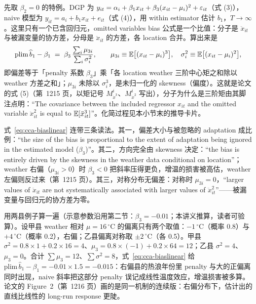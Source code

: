 先取 $\beta_2=0$ 的特例。DGP 为 $y_{it} = \alpha_i + \beta_1 x_{it} + \beta_3 (x_{it}-\mu_i)^2 + \varepsilon_{it}$（式 (3)），naive 模型为 $y_{it} = a_i + b_1 x_{it} + e_{it}$（式 (4)），用 within estimator 估计 $b_1$，$T\to\infty$。这里只有一个已含回归元，omitted variables bias 公式是一个比值：分子是 $\ddot{x}_{it}$ 与被漏变量的协方差，分母是 $\ddot{x}_{it}$ 的方差，各 location 合并。算出来是
\begin{equation}
\mathrm{plim}\,\widehat{b}_1 - \beta_1 \;=\; \beta_3\,\frac{\sum_i \mu_{3i}}{\sum_i \sigma_i^2},
\qquad
\mu_{3i} \equiv \mathbb{E}\bigl[(x_{it}-\mu_i)^3\bigr],\quad
\sigma_i^2 \equiv \mathbb{E}\bigl[(x_{it}-\mu_i)^2\bigr],
\label{eq:cca-biaslinear}
\end{equation}
即偏差等于「penalty 系数 $\beta_3$」乘「各 location weather 三阶中心矩之和除以 weather 方差之和」；$\mu_{3i}$ 未除以 $\sigma_i^3$，是未归一化的 skewness（偏度）。这就是论文的式 (5)（第~1215 页，以矩记号 $M^i_{\ddot{x}^3}$、$M^i_{\ddot{x}^2}$ 写出），分子为什么是三阶矩由其脚注点明：``The covariance between the included regressor $x_{it}$ and the omitted variable $\ddot{x}_{it}^2$ is equal to $\mathbb{E}[\ddot{x}_{it}^3]$''\citep[第~1215 页脚注~18]{merel2021climate}。化简过程见本小节末的推导卡片。

式~\ref{eq:cca-biaslinear} 连带三条读法。其一，偏差大小与被忽略的 adaptation 成比例：``the size of the bias is proportional to the extent of adaptation being ignored in the estimated model ($\beta_3$)''\citep[第~1215 页]{merel2021climate}。其二，方向完全由 skewness 决定：``the bias is entirely driven by the skewness in the weather data conditional on location''\citep[第~1215 页]{merel2021climate}；weather 右偏（$\mu_{3i}>0$）时 $\beta_3<0$ 把斜率压得更负，增温的损害被高估，weather 左偏则反过来（第~1215 页）。其三，对称分布无偏差：对称时 $\mu_{3i}=0$，``larger values of $\ddot{x}_{it}$ are not systematically associated with larger values of $\ddot{x}_{it}^2$''\citep[第~1215 页]{merel2021climate}——被漏变量与回归元的协方差为零。

用两县例子算一遍（示意参数沿用第二节：$\beta_3=-0.01$；本讲义推算，读者可验算）。设甲县 weather 相对 $\mu=16\,^\circ$C 的偏离只有两个取值：$-1\,^\circ$C（概率 0.8）与 $+4\,^\circ$C（概率 0.2），右偏；乙县偏离对称取 $\pm2\,^\circ$C（各 0.5）。甲县 $\sigma^2=0.8\times1+0.2\times16=4$、$\mu_3=0.8\times(-1)+0.2\times64=12$；乙县 $\sigma^2=4$、$\mu_3=0$。合计 $\sum\mu_3=12$、$\sum\sigma^2=8$，式~\ref{eq:cca-biaslinear} 给 $\mathrm{plim}\,\widehat{b}_1-\beta_1=-0.01\times1.5=-0.015$：右偏县的热浪年份里 penalty 与大的正偏离同时出现，naive 斜率把这部分 penalty 误记成线性温度效应，增温损害被多算。论文的 Figure~2（第~1216 页）画的是同一机制的连续版：右偏分布下，估计出的直线比线性的 long-run response 更陡。

